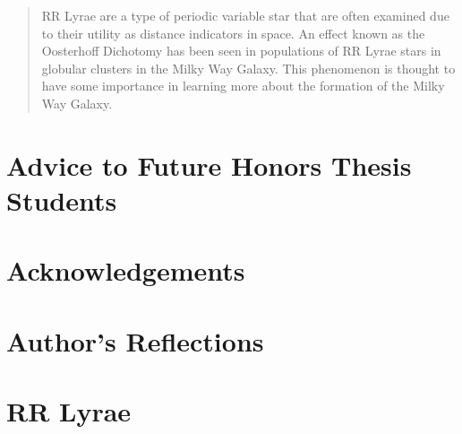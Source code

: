 \documentclass[]{article}
\title{}
\author{Christopher Wells}
\begin{document}
\maketitle

\newpage

\begin{abstract}
	
	RR Lyrae are a type of periodic variable star that are often examined due to their utility as distance indicators in space. An effect known as the Oosterhoff Dichotomy has been seen in populations of RR Lyrae stars in globular clusters in the Milky Way Galaxy. This phenomenon is thought to have some importance in learning more about the formation of the Milky Way Galaxy.

\end{abstract}

\newpage

\tableofcontents

\newpage

\section{Advice to Future Honors Thesis Students}

\newpage

\section{Acknowledgements}

\newpage

\section{Author's Reflections}

\newpage

\section{RR Lyrae}
\end{document}
